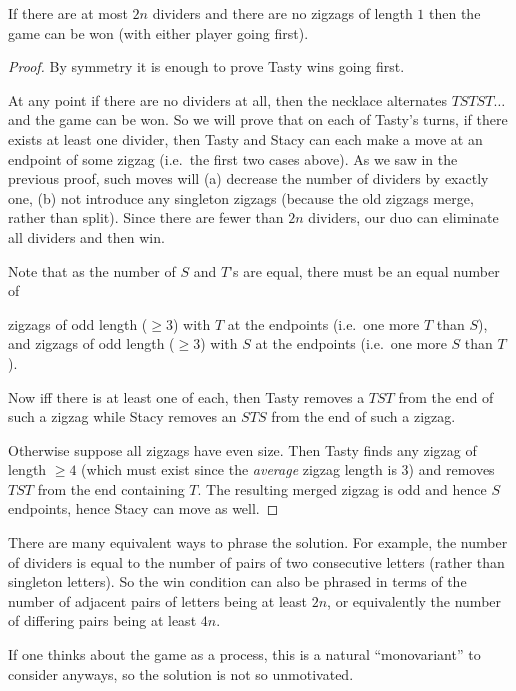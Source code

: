 \documentclass[11pt]{scrartcl}
\begin{document}
\begin{claim*}
  If there are at most $2n$ dividers
  and there are no zigzags of length $1$
  then the game can be won (with either player going first).
\end{claim*}
\begin{proof}
  By symmetry it is enough to prove Tasty wins going first.

  At any point if there are no dividers at all,
  then the necklace alternates $TSTST\dots$
  and the game can be won.
  So we will prove that on each of Tasty's turns,
  if there exists at least one divider,
  then Tasty and Stacy can each make a move
  at an endpoint of some zigzag
  (i.e.\ the first two cases above).
  As we saw in the previous proof, such moves will
  (a) decrease the number of dividers by exactly one,
  (b) not introduce any singleton zigzags
  (because the old zigzags merge, rather than split).
  Since there are fewer than $2n$ dividers,
  our duo can eliminate all dividers and then win.

  Note that as the number of $S$ and $T$'s are equal,
  there must be an equal number of
  \begin{itemize}
    \ii zigzags of odd length ($\ge 3$) with $T$ at the endpoints
    (i.e.\ one more $T$ than $S$), and
    \ii zigzags of odd length ($\ge 3$) with $S$ at the endpoints
    (i.e.\ one more $S$ than $T$).
  \end{itemize}
  Now iff there is at least one of each,
  then Tasty removes a $TST$ from the end of such a zigzag
  while Stacy removes an $STS$ from the end of such a zigzag.

  Otherwise suppose all zigzags have even size.
  Then Tasty finds any zigzag of length $\ge 4$
  (which must exist since the \emph{average} zigzag length is $3$)
  and removes $TST$ from the end containing $T$.
  The resulting merged zigzag is odd and hence $S$ endpoints,
  hence Stacy can move as well.
\end{proof}

\begin{remark*}
  There are many equivalent ways to phrase the solution.
  For example, the number of dividers is equal to the
  number of pairs of two consecutive letters
  (rather than singleton letters).
  So the win condition can also be phrased in terms
  of the number of adjacent pairs of letters being at least $2n$,
  or equivalently the number of differing pairs being at least $4n$.

  If one thinks about the game as a process,
  this is a natural ``monovariant'' to consider anyways,
  so the solution is not so unmotivated.
\end{remark*}
\end{document}
